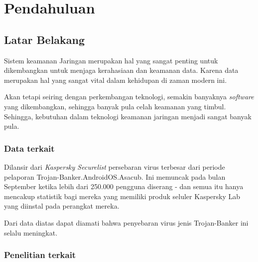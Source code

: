 \documentclass{report}
\begin{document}
\chapter{Pendahuluan}
\section{Latar Belakang}
\par Sistem keamanan Jaringan merupakan hal yang sangat penting untuk dikembangkan untuk menjaga kerahasiaan dan keamanan data. Karena data merupakan hal yang sangat vital dalam kehidupan di zaman modern ini.
\par
Akan tetapi seiring dengan perkembangan teknologi, semakin banyaknya \textit{software} yang dikembangkan, sehingga banyak pula celah keamanan yang timbul. Sehingga, kebutuhan dalam teknologi keamanan jaringan menjadi sangat banyak pula.
\subsection{Data terkait}
Dilansir dari \textit{Kaspersky Securelist} persebaran virus terbesar dari periode pelaporan Trojan-Banker.AndroidOS.Asacub. Ini memuncak pada bulan September ketika lebih dari 250.000 pengguna diserang - dan semua itu hanya mencakup statistik bagi mereka yang memiliki produk seluler Kaspersky Lab yang diinstal pada perangkat mereka.\par
{}
\label{1statistik}
\cite{chebysev_sinitsyn_parinov_kupreev_lopatin_liskin}
\par
Dari data diatas dapat diamati bahwa penyebaran virus jenis Trojan-Banker ini selalu meningkat.
\subsection{Penelitian terkait}
\end{document}
